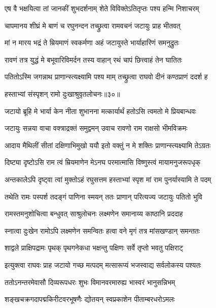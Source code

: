 \twolineshloka
{एष वै भक्षयित्वा तां जानकीं शुभदर्शनाम्}
{शेते विविक्तेऽतितृप्तः पश्य हन्मि निशाचरम्} %

\twolineshloka
{चापमानय शीघ्रं मे बाणं च रघुनन्दन}
{तच्छ्रुत्वा रामवचनं जटायुः प्राह भीतवत्} %

\twolineshloka
{मां न मारय भद्रं ते म्रियमाणं स्वकर्मणा}
{अहं जटायुस्ते भार्याहारिणं समनुद्रुतः} %

\twolineshloka
{रावणं तत्र युद्धं मे बभूवारिविमर्दन}
{तस्य वाहान् रथं चापं छित्त्वाहं तेन घातितः} %

\twolineshloka
{पतितोऽस्मि जगन्नाथ प्राणान्स्त्यक्ष्यामि पश्य माम्}
{तच्छ्रुत्वा राघवो दीनं कण्ठप्राणं ददर्श ह} %

{हस्ताभ्यां संस्पृशन् रामो दुःखाश्रुवृतलोचनः॥३०॥} %


\twolineshloka
{जटायो ब्रूहि मे भार्या केन नीता शुभानना}
{मत्कार्यार्थं हतोऽसि त्वमतो मे प्रियबान्धवः} %

\twolineshloka
{जटायुः सन्नया वाचा वक्त्राद्रक्तं समुद्वमन्}
{उवाच रावणो राम राक्षसो भीमविक्रमः} %

\twolineshloka
{आदाय मैथिलीं सीतां दक्षिणाभिमुखो ययौ}
{इतो वक्तुं न मे शक्तिः प्राणान्स्त्यक्ष्यामि तेऽग्रतः} %

\twolineshloka
{दिष्ट्या दृष्टोऽसि राम त्वं म्रियमाणेन मेऽनघ}
{परमात्मासि विष्णुस्त्वं मायामनुजरूपधृक्} %

\twolineshloka
{अन्तकालेऽपि दृष्ट्वा त्वां मुक्तोऽहं रघुसत्तम}
{हस्ताभ्यां स्पृश मां राम पुनर्यास्यामि ते पदम्} %

\twolineshloka
{तथेति रामः पस्पर्श तदङ्गं पाणिना स्मयन्}
{ततः प्राणान् परित्यज्य जटायुः पतितो भुवि} %

\twolineshloka
{रामस्तमनुशोचित्वा बन्धुवत् साश्रुलोचनः}
{लक्ष्मणेन समानाय्य काष्ठानि प्रददाह} %

\twolineshloka
{स्नात्वा दुःखेन रामोऽपि लक्ष्मणेन समन्वितः}
{हत्वा वने मृगं तत्र मांसखण्डान् समन्ततः} %

\twolineshloka
{शाद्वले प्राक्षिपद्रामः पृथक् पृथगनेकधा}
{भक्षन्तु पक्षिणः सर्वे तृप्तो भवतु पक्षिराट्} %

\twolineshloka
{इत्युक्त्वा राघवः प्राह जटायो गच्छ मत्पदम्}
{मत्सारूप्यं भजस्वाद्य सर्वलोकस्य पश्यतः} %

\twolineshloka
{ततोऽनन्तरमेवासौ दिव्यरूपधरः शुभः}
{विमानवरमारुह्य भास्वरं भानुसन्निभम्} %

\twolineshloka
{शङ्खचक्रगदापद्मकिरीटवरभूषणैः}
{द्योतयन् स्वप्रकाशेन पीताम्बरधरोऽमलः} %


